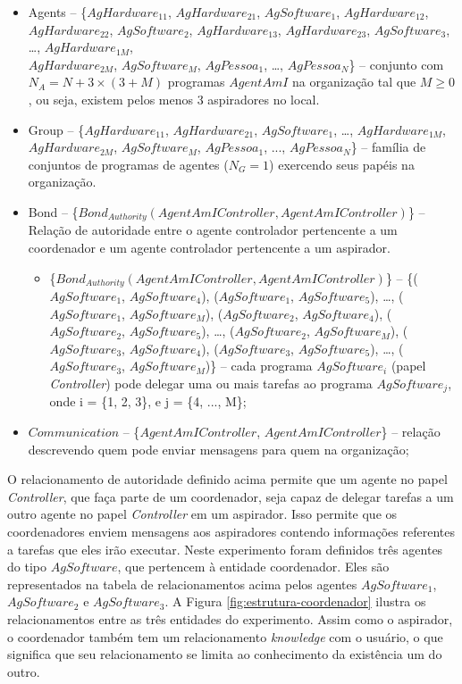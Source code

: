 \begin{itemize}
    \item Agents -- \{$AgHardware_{11}$, $AgHardware_{21}$, $AgSoftware_1$, $AgHardware_{12}$, $AgHardware_{22}$, $AgSoftware_2$, $AgHardware_{13}$, $AgHardware_{23}$, $AgSoftware_3$, \ldots, $AgHardware_{1M}$, \\$AgHardware_{2M}$, $AgSoftware_M$, $AgPessoa_1$, \ldots, $AgPessoa_N$\} – conjunto com $N_A = N + 3 \times (3 + M)$ programas $AgentAmI$ na organização tal que $M \geq 0$, ou seja, existem pelos menos 3 aspiradores no local.

    \item Group --	\{$AgHardware_{11}$, $AgHardware_{21}$, $AgSoftware_1$, \ldots, $AgHardware_{1M}$, $AgHardware_{2M}$, $AgSoftware_M$, $AgPessoa_1$, ..., $AgPessoa_N$\} – família de conjuntos de programas de agentes ($N_G = 1$) exercendo seus papéis na organização.
    
    \item Bond -- \{$Bond_{Authority}(AgentAmIController, AgentAmIController)$\} – Relação de autoridade entre o agente controlador pertencente a um coordenador e um agente controlador pertencente a um aspirador.
    
    \begin{itemize}
        \item \{$Bond_{Authority}(AgentAmIController, AgentAmIController)$\} – \{($AgSoftware_1$, $AgSoftware_4$), ($AgSoftware_1$, $AgSoftware_5$), \ldots, ($AgSoftware_1$, $AgSoftware_M$), ($AgSoftware_2$, $AgSoftware_4$), ($AgSoftware_2$, $AgSoftware_5$), \ldots, ($AgSoftware_2$, $AgSoftware_M$), ($AgSoftware_3$, $AgSoftware_4$), ($AgSoftware_3$, $AgSoftware_5$), \ldots, ($AgSoftware_3$, $AgSoftware_M$)\} – cada  programa $AgSoftware_i$ (papel \textit{Controller}) pode delegar uma ou mais tarefas ao programa $AgSoftware_j$, onde i = \{1, 2, 3\}, e j = \{4, ..., M\};
    \end{itemize}

    \item $Communication$	-- \{$AgentAmIController$, $AgentAmIController$\} – relação descrevendo quem pode enviar mensagens para quem na organização;

\end{itemize}

O relacionamento de autoridade definido acima permite que um agente no papel \textit{Controller}, que faça parte de um coordenador, seja capaz de delegar tarefas a um outro agente no papel \textit{Controller} em um aspirador. Isso permite que os coordenadores enviem mensagens aos aspiradores contendo informações referentes a tarefas que eles irão executar. Neste experimento foram definidos três agentes do tipo $AgSoftware$, que pertencem à entidade coordenador. Eles são representados na tabela de relacionamentos acima pelos agentes $AgSoftware_1$, $AgSoftware_2$ e $AgSoftware_3$.
A Figura \ref{fig:estrutura-coordenador} ilustra os relacionamentos entre as três entidades do experimento. Assim como o aspirador, o coordenador também tem um relacionamento \textit{knowledge} com o usuário, o que significa que seu relacionamento se limita ao conhecimento da existência um do outro.

